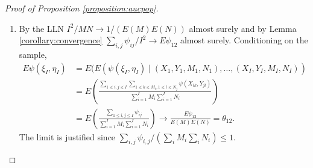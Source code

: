 \documentclass[12pt]{article}
\DeclareMathOperator{\AUC}{AUC}
\newcommand{\I}{I}
\newcommand{\E}{E}
\newcommand{\cind}{\perp \!\!\! \perp}
\newcommand{\aucpop}{\theta_{12}}%
\newcommand{\kernel}{\psi}
\newcommand{\Kernel}{\psi}
\begin{document}
  \begin{proof}[Proof of Proposition \ref{proposition:aucpop}]
    \begin{enumerate}
    \item By the LLN $\I^2/MN \to 1/(\E (M)\E (N))$ almost surely and by Lemma \ref{corollary:convergence} $\sum_{i,j}\Kernel_{ij}/\I^2 \to \E \Kernel_{12}$ almost surely. Conditioning on the sample,
      \begin{align}
        \E \kernel(\xi_\I,\eta_\I) &= \E( \E (\kernel(\xi_\I,\eta_\I) \mid (X_1,Y_1,M_1,N_1),\ldots,(X_\I,Y_\I,M_\I,N_\I))\\
                                   &= \E\left(\frac
                                     {\sum_{1\le i,j\le\I}\sum_{1\le k\le M_i,1\le l\le N_j}\kernel(X_{ik},Y_{jl})}
                                     {\sum_{i=1}^\I M_i \sum_{i=1}^\I N_i} \right)\\
                                   &= \E\left(\frac{\sum_{1\le i,j\le\I}\Kernel_{ij}}{\sum_{i=1}^\I M_i \sum_{i=1}^\I N_i} \right) \to \frac{\E\Kernel_{12}}{\E (M) \E (N)}=\aucpop.
      \end{align}
      The limit is justified since $\sum_{i,j}\psi_{i,j}/(\sum_i M_i\sum_i N_i)\le 1$. %


\end{enumerate}
\end{proof}
\end{document}
